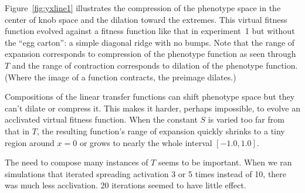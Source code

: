 \documentclass[letterpaper]{article}
\begin{document}
Figure~\ref{fig:yxline1} illustrates the compression of the phenotype space in the center of
knob space and the dilation toward the extremes. This virtual fitness function
evolved against a fitness function like that in experiment~1 but without the
``egg carton'': a simple diagonal ridge with no bumps. Note that the range of
expansion corresponds to compression of the phenotype function as seen through
$T$ and the range of contraction corresponds to dilation of the phenotype
function. (Where the image of a function contracts, the preimage dilates.)

Compositions of the linear transfer functions can shift phenotype space but they
can't dilate or compress it. This makes it harder, perhaps impossible, to
evolve an acclivated virtual fitness function. When the constant $S$ is varied
too far from that in $T$, the resulting function's range of expansion quickly
shrinks to a tiny region around $x=0$ or grows to nearly the whole interval
$[-1.0, 1.0]$.

The need to compose many instances of $T$ seems to be important. When we ran
simulations that iterated spreading activation 3 or 5 times instead of 10,
there was much less acclivation. 20 iterations seemed to have little effect.

%
%
%






\end{document}
